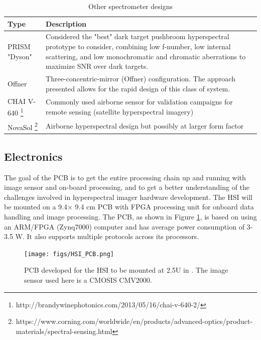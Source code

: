 \begin{table}[htbp]
	\caption{Other spectrometer designs}
	\label{tab:spectrometer_designs}
	\centering
			\begin{tabular}{|l|p{12cm}|}
				\hline 
				Type & Description \\
				\hline
				PRISM "Dyson" \cite{Mouroulis2014} & Considered the "best" dark target pushbroom hyperspectral prototype to consider, combining low f-number, low internal scattering, and low monochromatic and chromatic aberrations to maximize SNR over dark targets. \\
				\hline
				Offner \cite{PrietoBlanco2006}  & Three-concentric-mirror (Offner) configuration. The approach presented allows for the rapid design of this class of system. \\
				\hline
				CHAI V-640 \footnote{http://brandywinephotonics.com/2013/05/16/chai-v-640-2/} & Commonly used airborne sensor for validation campaigns for remote sensing (satellite hyperspectral imagery) \\
				\hline
				NovaSol \footnote{https://www.corning.com/worldwide/en/products/advanced-optics/product-materials/spectral-sensing.html} & Airborne hyperspectral design but possibly at larger form factor \\
				\hline
				\end{tabular}
\end{table}

\subsection{Electronics}
The goal of the PCB is to get the entire processing chain up and running with image sensor and on-board processing, and to get a better understanding of the challenges involved in hyperspectral imager hardware development. The HSI will be mounted on a 9.4$\times$ 9.4 cm PCB with FPGA processing unit for onboard data handling and image processing. The PCB, as shown in Figure \ref{fig:HSI_PCB}, is based on using an ARM/FPGA (Zynq7000) computer and has average power consumption of 3-3.5 W. It also supports multiple protocols across its processors.

\begin{figure}[htbp]
  \centering
      \texttt{[image: figs/HSI\_PCB.png]}
  \caption{PCB developed for the HSI to be mounted at 2.5U in \hypso. The image sensor used here is a CMOSIS CMV2000.}
	\label{fig:HSI_PCB}
\end{figure}

